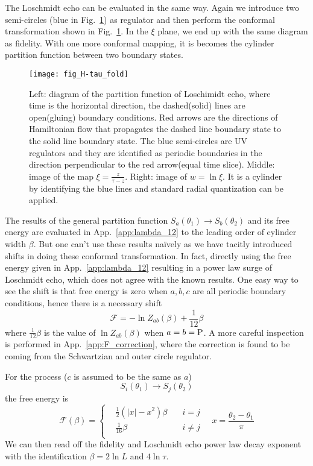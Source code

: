 The Loschmidt echo can be evaluated in the same way. Again we introduce two semi-circles (blue in Fig.~\ref{fig:H-tau_fold}) as regulator and then perform the conformal transformation shown in Fig.~\ref{fig:H-tau_fold}. In the $\xi$ plane, we end up with the same diagram as fidelity. With one more conformal mapping, it is becomes the cylinder partition function between two boundary states. 

\begin{figure}[htb]
\centering
\texttt{[image: fig\_H-tau\_fold]}
\caption{Left: diagram of the partition function of Loschimidt echo, where time is the horizontal direction, the dashed(solid) lines are open(gluing) boundary conditions. Red arrows are the directions of Hamiltonian flow that propagates the dashed line boundary state to the solid line boundary state. The blue semi-circles are UV regulators and they are identified as periodic boundaries in the direction perpendicular to the red arrow(equal time slice). Middle: image of the map $\xi = \frac{z}{\tau - z}$. Right: image of $w = \ln \xi$. It is a cylinder by identifying the blue lines and standard radial quantization can be applied. }
\label{fig:H-tau_fold}
\end{figure}

The results of the general partition function $S_a( \theta_1 ) \rightarrow S_b( \theta_2)$ and its free energy are evaluated in App.~\ref{app:lambda_12} to the leading order of cylinder width $\beta$. But one can't use these results na\"ively as we have tacitly introduced shifts in doing these conformal transformation. In fact, directly using the free energy given in App.~\ref{app:lambda_12} resulting in a power law surge of Loschmidt echo, which does not agree with the known results. One easy way to see the shift is that free energy is zero when $a,b,c$ are all periodic boundary conditions, hence there is a necessary shift
\begin{equation}
\mathcal{F} = - \ln Z_{ab} ( \beta ) + \frac{1}{12} \beta 
\end{equation}
where $\frac{1}{12}\beta$ is the value of $ \ln Z_{ab} ( \beta )$ when $a = b = {\rm P}$. A more careful inspection is performed in App.~\ref{app:F_correction}, where the correction is found to be coming from the Schwartzian and outer circle regulator. 

For the process ($c$ is assumed to be the same as $a$)
\begin{equation}
S_i( \theta_1 ) \rightarrow S_j( \theta_2 ) 
\end{equation}
the free energy is
\begin{equation}
\mathcal{F}( \beta )  = 
\left\lbrace
\begin{aligned}
  &\frac{1}{2}(|x| - x^2 )\beta  \quad &i = j \\
  &\frac{1}{16}\beta   \quad &i \ne j   \\
\end{aligned} \right. \quad x = \frac{\theta_2 - \theta_1}{\pi} 
\end{equation}
We can then read off the fidelity and Loschmidt echo power law decay exponent with the identification $\beta = 2 \ln L$ and $ 4 \ln \tau$. 

